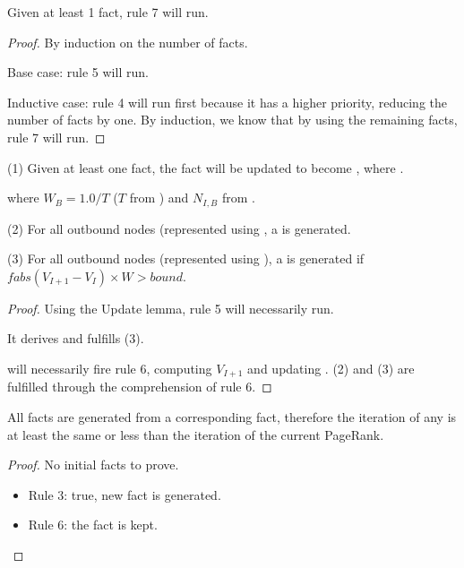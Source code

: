 \begin{lemma}
Given at least 1  fact, rule 7 will run.
\end{lemma}
\begin{proof}
By induction on the number of  facts.

Base case: rule 5 will run.

Inductive case: rule 4 will run first because it has a higher priority, reducing
the number of  facts by one. By induction, we know that by
using the remaining  facts, rule 7 will run.
\end{proof}

\begin{lemma}
(1) Given at least one  fact, the  fact will be updated to become , where .

where $W_B = 1.0/T$ ($T$ from )
and $N_{I,B}$ from .

(2) For all  outbound nodes (represented using , a  is generated.

(3) For all  outbound nodes (represented using ), a  is generated if 
$fabs(V_{I + 1} - V_{I}) \times W > bound$.
\end{lemma}
\begin{proof}
Using the Update lemma, rule 5 will necessarily run.

It derives  and
fulfills (3).

 will necessarily fire rule 6,
computing $V_{I+1}$ and updating . (2) and (3) are fulfilled
through the comprehension of rule 6.
\end{proof}

\begin{invariant}
All  facts are generated from a corresponding
 fact, therefore the iteration of any
 is at least the same or less than the iteration of
the current PageRank.
\end{invariant}
\begin{proof}
No initial facts to prove.

\begin{itemize}
   \item Rule 3: true, new fact is generated.
   \item Rule 6: the fact is kept.
\end{itemize}
\end{proof}


